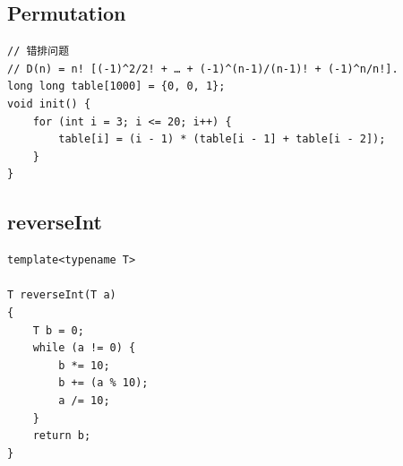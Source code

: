 \documentclass[twoside]{article}
\begin{document}
\subsection{Permutation}
\begin{lstlisting}
// 错排问题
// D(n) = n! [(-1)^2/2! + … + (-1)^(n-1)/(n-1)! + (-1)^n/n!].
long long table[1000] = {0, 0, 1};
void init() {
    for (int i = 3; i <= 20; i++) {
        table[i] = (i - 1) * (table[i - 1] + table[i - 2]);
    }
}\end{lstlisting}
\subsection{reverseInt}
\begin{lstlisting}
template<typename T>

T reverseInt(T a)
{
	T b = 0;
	while (a != 0) {
		b *= 10;
		b += (a % 10);
		a /= 10;
	}
	return b;
}\end{lstlisting}
\end{document}
